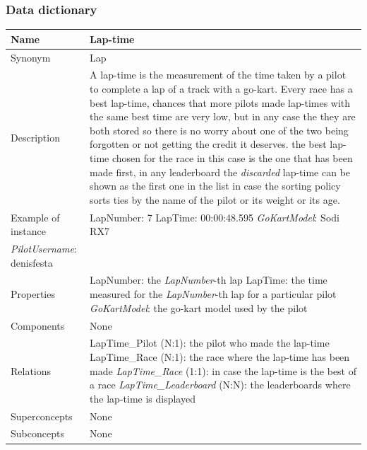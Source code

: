 \documentclass{beamer}
\begin{document}
\begin{frame}
\frametitle{Data dictionary}
\begin{table}
\tiny
\begin{tabular}{|p{2cm}|p{6cm}|}
\hline
Name & \textbf{Lap-time} \\
\hline
Synonym & Lap \\
\hline
Description & A lap-time is the measurement 
of the time taken by a pilot to complete a lap 
of a track with a go-kart. 
Every race has a best lap-time,
chances that more pilots made lap-times with the same
best time are very low, but in any case the they are both stored
so there is no worry about one of the two being forgotten or not
getting the credit it deserves.
the best lap-time chosen for the race in this case is the one 
that has been made first, in any leaderboard the \textit{discarded}
lap-time can be shown as the first one in the list in case the sorting
policy sorts ties by the name of the pilot or its weight or its age. \\
\hline
Example of instance &
LapNumber: 7 \newline
LapTime: 00:00:48.595 \newline
\textit{GoKartModel}: Sodi RX7 \\
\textit{PilotUsername}: denisfesta \\
\hline
Properties &
LapNumber: the \textit{LapNumber}-th lap \newline
LapTime: the time measured for the \textit{LapNumber}-th lap for 
a particular pilot \newline
\textit{GoKartModel}: the go-kart model used by the pilot \\
\hline
Components & None \\
\hline
Relations & 
LapTime\_Pilot (N:1): the pilot who made the lap-time \newline
LapTime\_Race (N:1): the race where the lap-time has been made \newline
\textit{LapTime\_Race} (1:1): in case the lap-time is the best of a race \newline
\textit{LapTime\_Leaderboard} (N:N): the leaderboards where the lap-time is displayed \\
\hline
Superconcepts & None \\
\hline
Subconcepts & None \\
\hline
\end{tabular}
\end{table}
\end{frame}
\end{document}
